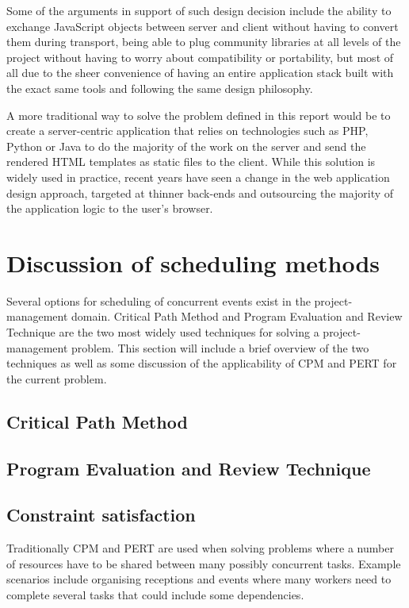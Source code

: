 \documentclass[bsc,frontabs,twoside,singlespacing,parskip]{infthesis}     %
\begin{document}
	Some of the arguments in support of such design decision include the ability to exchange JavaScript objects between server and client without having to convert them during transport, being able to plug community libraries at all levels of the project without having to worry about compatibility or portability, but most of all due to the sheer convenience of having an entire application stack built with the exact same tools and following the same design philosophy.

	A more traditional way to solve the problem defined in this report would be to create a server-centric application that relies on technologies such as PHP, Python or Java to do the majority of the work on the server and send the rendered HTML templates as static files to the client. While this solution is widely used in practice, recent years have seen a change in the web application design approach, targeted at thinner back-ends and outsourcing the majority of the application logic to the user's browser.

	\section{Discussion of scheduling methods}\label{scheduling}

		Several options for scheduling of concurrent events exist in the project-management domain. Critical Path Method and Program Evaluation and Review Technique are the two most widely used techniques for solving a project-management problem. This section will include a brief overview of the two techniques as well as some discussion of the applicability of CPM and PERT for the current problem.

			\subsection{Critical Path Method}

			\subsection{Program Evaluation and Review Technique}

			\subsection{Constraint satisfaction}

		Traditionally CPM and PERT are used when solving problems where a number of resources have to be shared between many possibly concurrent tasks. Example scenarios include organising receptions and events where many workers need to complete several tasks that could include some dependencies.
\end{document}

